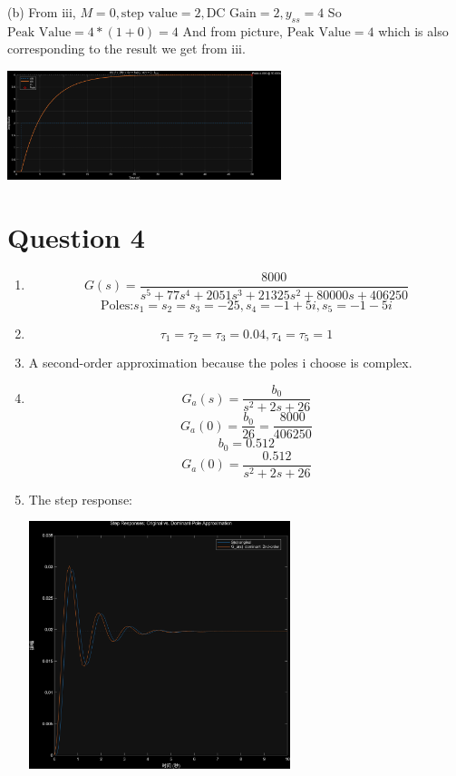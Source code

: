 \documentclass[12pt]{article}
\begin{document}
\begin{enumerate}[label=\roman*.]
        (b) From iii, $M = 0, \text{step value} = 2, \text{DC Gain}
        =2, y_{ss} = 4$
        So $\text{Peak Value} = 4 * (1+0) = 4$
        And from picture, $\text{Peak Value} = 4$ which is also corresponding to
        the result we get from iii.
        \begin{center}
            \includegraphics[width=0.6\textwidth]{Q3b.png}
        \end{center}

    \end{enumerate}

\section*{Question 4}
    \begin{enumerate}[label=(\alph*)]
        \item \[G(s) = \frac{8000}{s^5 + 77s^4 +2051s^3 + 21325s^2 + 80000s +
            406250}\]
        \[\text{Poles:} s_1 = s_2 = s_3 = -25, s_4 = -1+5i, s_5 = -1-5i\]

        \item \[\tau_1 = \tau_2 = \tau_3 = 0.04, \tau_4 = \tau_5 = 1\]
        
        \item A second-order approximation because the poles i choose is 
            complex.

        \item \[G_a(s) = \frac{b_0}{s^2+2s+26}\]
        \[G_a(0) = \frac{b_0}{26} = \frac{8000}{406250}\]
        \[b_0 = 0.512\]
        \[G_a(0) = \frac{0.512}{s^2+2s+26}\]

        \item The step response:
        \begin{center}
            \includegraphics[width=0.6\textwidth]{Q4.png}
        \end{center}

    \end{enumerate}
\end{document}
